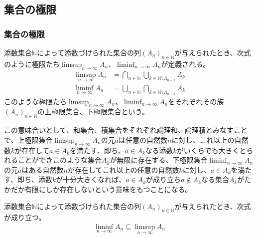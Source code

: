 \documentclass[dvipdfmx]{jsarticle}
\begin{document}
\subsection{集合の極限}%
\subsubsection{集合の極限}%
\begin{dfn}
添数集合$\mathbb{N}$によって添数づけられた集合の列$\left( A_{n} \right)_{n \in \mathbb{N}}$が与えられたとき、次式のように極限たち$\limsup_{n \rightarrow \infty}A_{n}$、$\liminf_{n \rightarrow \infty}A_{n}$が定義される。
\begin{align*}
\limsup_{n \rightarrow \infty}A_{n} &= \bigcap_{n \in \mathbb{N}} {\bigcup_{k \in \mathbb{N} \setminus \varLambda_{n - 1}} A_{k}}\\
\liminf_{n \rightarrow \infty}A_{n} &= \bigcup_{n \in \mathbb{N}} {\bigcap_{k \in \mathbb{N} \setminus \varLambda_{n - 1}} A_{k}}
\end{align*}
このような極限たち$\limsup_{n \rightarrow \infty}A_{n}$、$\liminf_{n \rightarrow \infty}A_{n}$をそれぞれその族$\left( A_{n} \right)_{n \in \mathbb{N}}$の上極限集合、下極限集合という。
\end{dfn}\par
この意味合いとして、和集合、積集合をそれぞれ論理和、論理積とみなすことで、上極限集合$\limsup_{n \rightarrow \infty}A_{n}$の元$a$は任意の自然数$n$に対し、これ以上の自然数$k$が存在して$a \in A_{k}$を満たす、即ち、$a \in A_{k}$なる添数$k$がいくらでも大きくとられることができこのような集合$A_{k}$が無限に存在する、下極限集合$\liminf_{n \rightarrow \infty}A_{n}$の元$a$はある自然数$n$が存在してこれ以上の任意の自然数$k$に対し、$a \in A_{k}$を満たす、即ち、添数$k$が十分大きくなれば、$a \in A_{k}$が成り立ち$a \notin A_{k}$なる集合$A_{k}$がたかだか有限にしか存在しないという意味をもつことになる。
\begin{thm}\label{4.5.1.1}
添数集合$\mathbb{N}$によって添数づけられた集合の列$\left( A_{n} \right)_{n \in \mathbb{N}}$が与えられたとき、次式が成り立つ。
\begin{align*}
\liminf_{n \rightarrow \infty}A_{n} \subseteq \limsup_{n \rightarrow \infty}A_{n}
\end{align*}
\end{thm}
\end{document}
